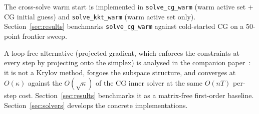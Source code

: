 The cross-solve warm start is implemented in \texttt{solve\_cg\_warm}
(warm active set $+$ CG initial guess) and \texttt{solve\_kkt\_warm}
(warm active set only).  Section~\ref{sec:results} benchmarks \texttt{solve\_cg\_warm}
against cold-started CG on a 50-point frontier sweep.

\medskip
A loop-free alternative (projected gradient, which enforces the constraints at
every step by projecting onto the simplex) is analysed in the companion
paper~\cite{schmelzer2026nncg}: it is not a Krylov method, forgoes the subspace
structure, and converges at $O(\kappa)$ against the $O(\sqrt{\kappa})$ of the CG inner
solver at the same $O(nT)$ per-step cost. Section~\ref{sec:results} benchmarks it as a
matrix-free first-order baseline.
Section~\ref{sec:solvers} develops the concrete implementations.
